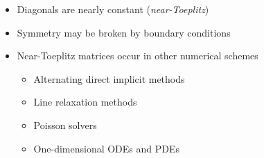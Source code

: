 \begin{frame}
\begin{columns}
\begin{column}{0.5\textwidth}
\begin{itemize}
    \item Diagonals are nearly constant (\emph{near-Toeplitz})
    \item Symmetry may be broken by boundary conditions
    \item Near-Toeplitz matrices occur in other numerical schemes
    \begin{itemize}
        \item Alternating direct implicit methods
        \item Line relaxation methods
        \item Poisson solvers
        \item One-dimensional ODEs and PDEs
    \end{itemize}
\end{itemize}
\end{column}
\begin{column}{0.5\textwidth}
\centering
{}
\end{column}
\end{columns}
\end{frame}

